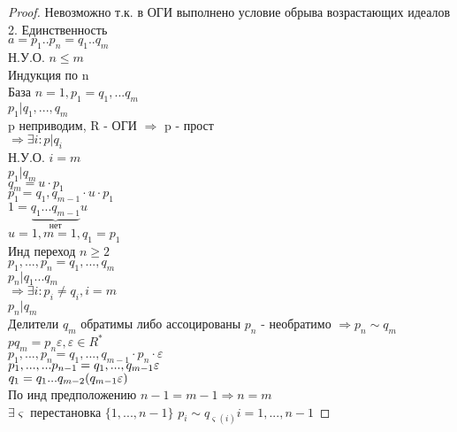 \begin{theorem}
\begin{proof}
		Невозможно т.к. в ОГИ выполнено условие обрыва возрастающих идеалов \\
		2. Единственность \\
		$ a = p_1 .. p_n = q_1 .. q_m $ \\
		Н.У.О. $ n \leq m $ \\
		Индукция по n \\
		База $ n = 1, p_1 = q_1, ... q_m $ \\
		$ p_1 | q_1, ..., q_m $ \\
		p неприводим, R - ОГИ $\Rightarrow$ p - прост\\
		$ \Rightarrow \exists i : p | q_i $ \\
		Н.У.О. $ i = m $ \\
		$ p_1 | q_m $ \\
		$ q_m = u \cdot p_1 $ \\
		$ p_1 = q_1, q_{m-1} \cdot u \cdot p_1 $ \\
		$ 1 = \underbrace{q_1 ... q_{m-1}}_{\text{нет}} u $ \\
		$ u = 1, m = 1, q_1 = p_1 $ \\
		Инд переход $ n \geq 2 $ \\
		$ p_1, ..., p_n = q_1,..., q_m $ \\
		$ p_n | q_1 ... q_m $ \\
		$ \Rightarrow \exists i : p_i \neq q_i, i = m $ \\
		$ p_n | q_m $ \\
		Делители $ q_m $ обратимы либо ассоцированы $p_n$ - необратимо $ \Rightarrow p_n \sim q_m $ \\
		$ pq_m = p_n\varepsilon, \varepsilon \in R^* $ \\
		$ p_1, ..., p_n = q_1,..., q_{m-1} \cdot p_n \cdot \varepsilon $\\
		$ p_1, ..., ... p_{n-1} = q_1, ..., q_{m-1} \varepsilon $ \\
		$ q_1 = q_1...q_{m-2} (q_{m-1} \varepsilon) $ \\
		По инд предположению $ n-1 = m-1 \Rightarrow n = m $ \\
		$ \exists \varsigma $ перестановка $ \{1, ..., n-1\}$ 
		$ p_i \sim q_{\varsigma(i)} i = 1, ..., n-1 $ 
	\end{proof}
\end{theorem}



 
 
 
 
 